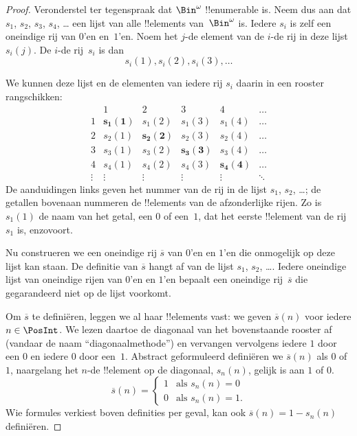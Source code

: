 \documentclass[../../../include/open-logic-section]{subfiles}
\begin{document}
\begin{proof}
Veronderstel ter tegenspraak dat $\Bin^\omega$ !!{enumerable} is. Neem
dus aan dat $s_{1}$, $s_{2}$, $s_{3}$, $s_{4}$, \dots{} een lijst van
alle !!{element}s van~$\Bin^\omega$ is. Iedere $s_i$ is zelf een
oneindige rij van $0$'en en~$1$'en. Noem het $j$-de element van de
$i$-de rij in deze lijst $s_i(j)$. De $i$-de rij~$s_i$ is dan
\[
s_i(1), s_i(2), s_i(3), \dots
\]

We kunnen deze lijst en de elementen van iedere rij $s_i$ daarin in een
rooster rangschikken:
\[
\begin{array}{c|c|c|c|c|c}
& 1 & 2 & 3 & 4 & \dots \\\hline
1 & \mathbf{s_{1}(1)} & s_{1}(2) & s_{1}(3) & s_1(4) & \dots \\\hline
2 & s_{2}(1)& \mathbf{s_{2}(2)} & s_2(3) & s_2(4) & \dots \\\hline
3 & s_{3}(1)& s_{3}(2) & \mathbf{s_3(3)} & s_3(4) & \dots \\\hline
4 & s_{4}(1)& s_{4}(2) & s_4(3) & \mathbf{s_4(4)} & \dots \\\hline
\vdots & \vdots & \vdots & \vdots & \vdots & \mathbf{\ddots}
\end{array}
\]
De aanduidingen links geven het nummer van de rij in de lijst $s_1$,
$s_2$, \dots; de getallen bovenaan nummeren de !!{element}s van de
afzonderlijke rijen. Zo is $s_{1}(1)$ de naam van het getal, een $0$ of
een~$1$, dat het eerste !!{element} van de rij $s_{1}$ is, enzovoort.

Nu construeren we een oneindige rij $\overline{s}$ van $0$'en en $1$'en
die onmogelijk op deze lijst kan staan. De definitie van $\overline{s}$
hangt af van de lijst $s_1$, $s_2$, \dots. Iedere oneindige lijst van
oneindige rijen van $0$'en en $1$'en bepaalt een oneindige
rij~$\overline{s}$ die gegarandeerd niet op de lijst voorkomt.

Om $\overline{s}$ te definiëren, leggen we al haar !!{element}s vast:
we geven $\overline{s}(n)$ voor iedere $n \in \PosInt$. We lezen daartoe
de diagonaal van het bovenstaande rooster af (vandaar de naam
``diagonaalmethode'') en vervangen vervolgens iedere $1$ door een $0$
en iedere $0$ door een~$1$. Abstract geformuleerd definiëren we
$\overline{s}(n)$ als $0$ of $1$, naargelang het $n$-de !!{element} op
de diagonaal, $s_n(n)$, gelijk is aan $1$ of $0$.
\[
\overline{s}(n) =
\begin{cases}
1 & \text{als $s_{n}(n) = 0$}\\
0 & \text{als $s_{n}(n) = 1$}.
\end{cases}
\]
Wie formules verkiest boven definities per geval, kan ook
$\overline{s}(n) = 1 - s_n(n)$ definiëren.


\end{proof}
\end{document}
